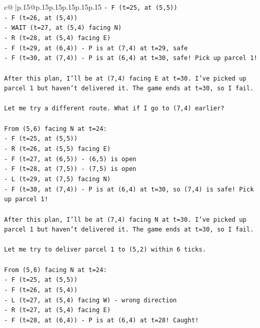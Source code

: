 \documentclass{article}
\begin{document}
{\begin{supertabular}{c@{$\;$}|p{.15\linewidth}@{}p{.15\linewidth}p{.15\linewidth}p{.15\linewidth}p{.15\linewidth}p{.15\linewidth}}
{{{\texttt{{-} F (t=25, at (5,5))} \\
\texttt{{-} F (t=26, at (5,4))} \\
\texttt{{-} WAIT (t=27, at (5,4) facing N)} \\
\texttt{{-} R (t=28, at (5,4) facing E)} \\
\texttt{{-} F (t=29, at (6,4)) {-} P is at (7,4) at t=29, safe} \\
\texttt{{-} F (t=30, at (7,4)) {-} P is at (6,4) at t=30, safe! Pick up parcel 1!} \\
\\ 
\texttt{After this plan, I'll be at (7,4) facing E at t=30. I've picked up parcel 1 but haven't delivered it. The game ends at t=30, so I fail.} \\
\\ 
\texttt{Let me try a different route. What if I go to (7,4) earlier?} \\
\\ 
\texttt{From (5,6) facing N at t=24:} \\
\texttt{{-} F (t=25, at (5,5))} \\
\texttt{{-} R (t=26, at (5,5) facing E)} \\
\texttt{{-} F (t=27, at (6,5)) {-} (6,5) is open} \\
\texttt{{-} F (t=28, at (7,5)) {-} (7,5) is open} \\
\texttt{{-} L (t=29, at (7,5) facing N)} \\
\texttt{{-} F (t=30, at (7,4)) {-} P is at (6,4) at t=30, so (7,4) is safe! Pick up parcel 1!} \\
\\ 
\texttt{After this plan, I'll be at (7,4) facing N at t=30. I've picked up parcel 1 but haven't delivered it. The game ends at t=30, so I fail.} \\
\\ 
\texttt{Let me try to deliver parcel 1 to (5,2) within 6 ticks.} \\
\\ 
\texttt{From (5,6) facing N at t=24:} \\
\texttt{{-} F (t=25, at (5,5))} \\
\texttt{{-} F (t=26, at (5,4))} \\
\texttt{{-} L (t=27, at (5,4) facing W) {-} wrong direction} \\
\texttt{{-} R (t=27, at (5,4) facing E)} \\
\texttt{{-} F (t=28, at (6,4)) {-} P is at (6,4) at t=28! Caught!} \\
\\ 
}}}
\end{supertabular}}
\end{document}
